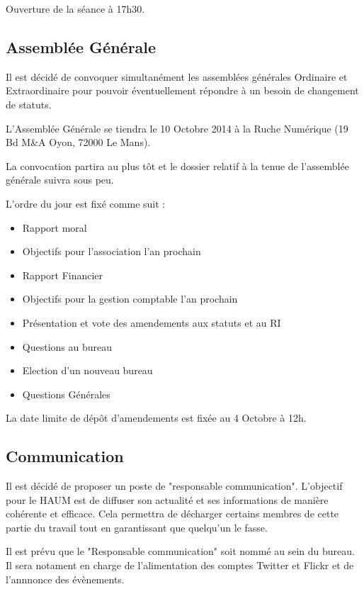 \documentclass[a4paper, 11pt]{article}
\begin{document}
	\bigskip

	Ouverture de la séance à 17h30.

	\bigskip

	\subsection{Assemblée Générale}

	Il est décidé de convoquer simultanément les assemblées générales Ordinaire et Extraordinaire pour pouvoir
	éventuellement répondre à un besoin de changement de statuts.

	L'Assemblée Générale se tiendra le 10 Octobre 2014 à la Ruche Numérique (19 Bd M\&A Oyon, 72000 Le Mans).

	La convocation partira au plus tôt et le dossier relatif à la tenue de l'assemblée générale suivra sous peu.

	L'ordre du jour est fixé comme suit :

	\begin{itemize}
			\item Rapport moral
			\item Objectifs pour l'association l'an prochain
			\item Rapport Financier
			\item Objectifs pour la gestion comptable l'an prochain
			\item Présentation et vote des amendements aux statuts et au RI
			\item Questions au bureau
			\item Election d'un nouveau bureau
			\item Questions Générales
	\end{itemize}

	La date limite de dépôt d'amendements est fixée au 4 Octobre à 12h.

	\subsection{Communication}

	Il est décidé de proposer un poste de "responsable communication". L'objectif pour le HAUM est de diffuser son
	actualité et ses informations de manière cohérente et efficace. Cela permettra de décharger certains membres de
	cette partie du travail tout en garantissant que quelqu'un le fasse.

	Il est prévu que le "Responsable communication" soit nommé au sein du bureau.
	Il sera notament en charge de l'alimentation des comptes Twitter et Flickr et de l'annnonce des évènements.
\end{document}
